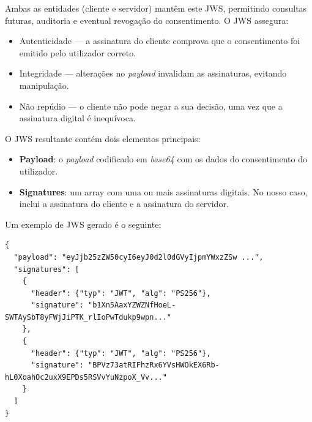 Ambas as entidades (cliente e servidor) mantêm este JWS, permitindo consultas futuras, auditoria e eventual revogação do consentimento. O JWS assegura:

\begin{itemize}
    \item Autenticidade — a assinatura do cliente comprova que o consentimento foi emitido pelo utilizador correto.
    \item Integridade — alterações no \textit{payload} invalidam as assinaturas, evitando manipulação.
    \item Não repúdio — o cliente não pode negar a sua decisão, uma vez que a assinatura digital é inequívoca.
\end{itemize}

%
%
%
%

O JWS resultante contém dois elementos principais:

\begin{itemize}
    \item \textbf{Payload}: o \textit{payload} codificado em \textit{base64} com os dados do consentimento do utilizador.
    \item \textbf{Signatures}: um array com uma ou mais assinaturas digitais. No nosso caso, inclui a assinatura do cliente e a assinatura do servidor.
\end{itemize}

Um exemplo de JWS gerado é o seguinte:

\begin{lstlisting}
{
  "payload": "eyJjb25zZW50cyI6eyJ0d2l0dGVyIjpmYWxzZSw ...",
  "signatures": [
    {
      "header": {"typ": "JWT", "alg": "PS256"},
      "signature": "b1Xn5AaxYZWZNfHoeL-SWTAySbT8yFWjJiPTK_rlIoPwTdukp9wpn..."
    },
    {
      "header": {"typ": "JWT", "alg": "PS256"},
      "signature": "BPVz73atRIFhzRx6YVsHWOkEX6Rb-hL0XoahOc2uxX9EPDs5RSVvYuNzpoX_Vv..."
    }
  ]
}
\end{lstlisting}

